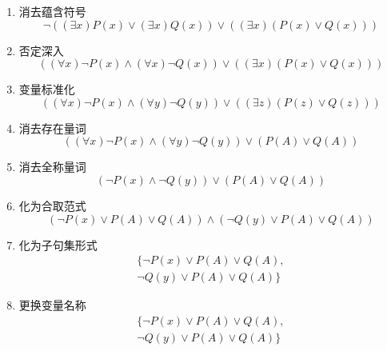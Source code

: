 \begin{example}
\begin{itemize}
        \begin{enumerate}
            \item 消去蕴含符号
            \[
                \lnot \left( (\exists x)P(x)\lor (\exists x)Q(x) \right)\lor \left( (\exists x)(P(x)\lor Q(x)) \right)
            \]
            \item 否定深入
            \[
                \left((\forall x)\lnot P(x)\land (\forall  x)\lnot Q(x) \right)\lor \left( (\exists x)(P(x)\lor Q(x)) \right) 
            \]
            \item 变量标准化
            \[
                \left((\forall x)\lnot P(x)\land (\forall  y)\lnot Q(y) \right)\lor \left( (\exists z)(P(z)\lor Q(z)) \right) 
            \]
            \item 消去存在量词
            \[
                \left((\forall x)\lnot P(x)\land (\forall  y)\lnot Q(y) \right)\lor \left( P(A)\lor Q(A)\right) 
            \]
            \item 消去全称量词
            \[
                \left(\lnot P(x)\land \lnot Q(y) \right)\lor \left( P(A)\lor Q(A)\right) 
            \]
            \item 化为合取范式
            \[
                \left(\lnot P(x)\lor P(A)\lor Q(A) \right)\land \left(\lnot Q(y)\lor P(A)\lor Q(A) \right)
            \]
            \item 化为子句集形式
            \[
                \begin{array}{l}
                    \{  \lnot P(x)\lor P(A)\lor Q(A),\\ 
                    \lnot Q(y)\lor P(A)\lor Q(A) \}
                \end{array}
            \]
            \item 更换变量名称
            \[
                \begin{array}{l}
                    \{  \lnot P(x)\lor P(A)\lor Q(A),\\ 
                    \lnot Q(y)\lor P(A)\lor Q(A) \}
                \end{array}
            \]
        \end{enumerate}
    \end{itemize}
\end{example}
